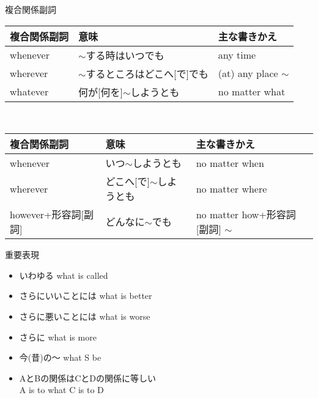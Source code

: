 \documentclass[10pt]{jsarticle}
\newcommand{\answer}[2]{{\color{orange}#2}}
\newcommand{\answer}[2]{\vspace{#1mm}}
\begin{document}
\begin{itembox}[l]{複合関係副詞}
	\answer{10}{
		\begin{tabular}{|l|l|l|}
			\hline
			複合関係副詞 & 意味                                 & 主な書きかえ            \\ \hline
			whenever     & $\sim$する時はいつでも               & any   time              \\ \hline
			wherever     & $\sim$するところはどこへ{[}で{]}でも & (at)   any place $\sim$ \\ \hline
			whatever     & 何が{[}何を{]}$\sim$しようとも       & no   matter what        \\ \hline
		\end{tabular}
		\\
		\begin{tabular}{|l|l|l|}
			\hline
			複合関係副詞             & 意味                           & 主な書きかえ                            \\ \hline
			whenever                 & いつ$\sim$しようとも           & no   matter when                        \\ \hline
			wherever                 & どこへ{[}で{]}$\sim$しようとも & no   matter where                       \\ \hline
			however+形容詞{[}副詞{]} & どんなに$\sim$でも             & no   matter how+形容詞{[}副詞{]} $\sim$ \\ \hline
		\end{tabular}
	}
\end{itembox}



\begin{itembox}[l]{重要表現}
	\begin{multicols}{2}
		\begin{itemize}
			\item いわゆる  \answer{5}{what is called}
			\item さらにいいことには  \answer{5}{what is better}
			\item さらに悪いことには  \answer{5}{what is worse}
			\item さらに  \answer{5}{what is more}
			\item 今(昔)の〜  \answer{5}{what S be}
			\item AとBの関係はCとDの関係に等しい \\ \answer{5}{A is to what C is to D}
		\end{itemize}
	\end{multicols}
\end{itembox}
\end{document}
